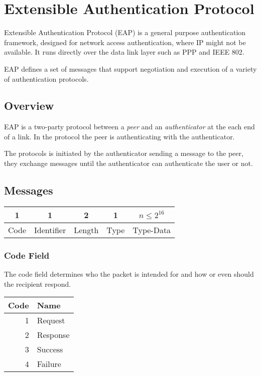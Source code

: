 \section{Extensible Authentication Protocol}

Extensible Authentication Protocol \cite{aboba2004extensible} (EAP) is a general purpose authentication framework, designed for network access authentication, where IP might not be available. 
It runs directly over the data link layer such as PPP  \cite{simpson1994rfc1661} and IEEE 802.

EAP defines a set of messages that support negotiation and execution of a variety of authentication protocols.


\subsection{Overview}
EAP is a two-party protocol between a \textit{peer} and an \textit{authenticator} at the each end of a link. In the protocol the peer is authenticating with the authenticator.

The protocols is initiated by the authenticator sending a message to the peer, they exchange messages until the authenticator can authenticate the user or not.

\subsection{Messages}

\begin{center}
	\begin{tabular}{|c|c|c|c|c|}
		\hline
		1  & 1 & 2 & 1 & $n \le 2^{16}$\\
		\hline
		Code & Identifier & Length & Type & Type-Data\\
		\hline
	\end{tabular}
\end{center}


\subsubsection{Code Field}
The code field determines who the packet is intended for and how or even should the recipient respond.
\bigskip
\newline
\begin{tabular}{rl}
	Code & Name\\
	\hline
	1 & Request\\
	2 & Response\\
	3 & Success\\
	4 & Failure\\
\end{tabular}

